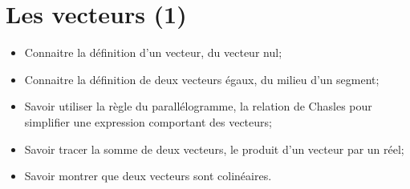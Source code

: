 \chapter{Les vecteurs (1)}\label{ChLesVecteurs}

\begin{acquis}
\begin{itemize}
\item Connaitre la définition d'un vecteur, du vecteur nul;
\item Connaitre la définition de deux  vecteurs égaux, du milieu d'un segment;
\item Savoir utiliser la règle du parallélogramme, la relation de Chasles pour simplifier une expression comportant des vecteurs;
\item Savoir tracer la somme de deux vecteurs, le produit d'un vecteur par un réel;
\item Savoir montrer que deux vecteurs sont colinéaires.
\end{itemize}
\end{acquis}



\exercicesbase
\begin{colonne*exercice}

\end{colonne*exercice}




\connaissances




\pagebreak



